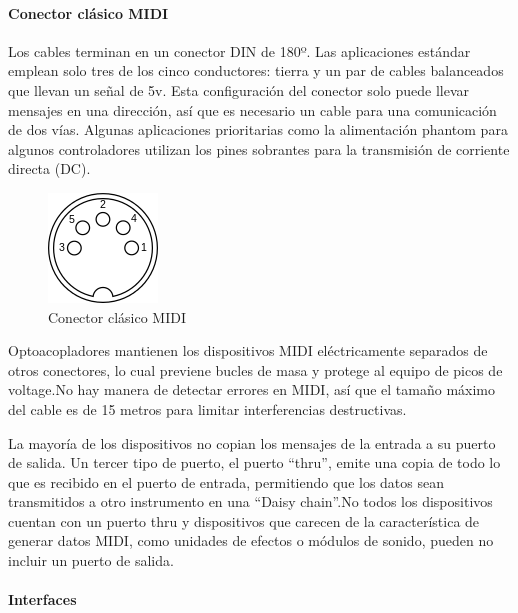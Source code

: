 \documentclass[a4paper,11pt,oneside]{book}
\begin{document}
\paragraph{Conector clásico MIDI}

Los cables terminan en un conector DIN de 180º. Las aplicaciones estándar emplean solo tres de los cinco conductores: tierra y un par de cables balanceados que llevan un señal de 5v. Esta configuración del conector solo puede llevar mensajes en una dirección, así que es necesario un cable para una comunicación de dos vías. Algunas aplicaciones prioritarias como la alimentación phantom para algunos controladores utilizan los pines sobrantes para la transmisión de corriente directa (DC).


\begin{figure}[H]
\begin{center}
\includegraphics[scale=0.2]{Imagenes/MIDI_connector2.png}
\caption{Conector clásico MIDI}
\label{Conector clásico MIDI}
\end{center}
\end{figure}

Optoacopladores mantienen los dispositivos MIDI eléctricamente separados de otros conectores, lo cual previene bucles de masa y protege al equipo de picos de voltage.No hay manera de detectar errores en MIDI, así que el tamaño máximo del cable es de 15 metros para limitar interferencias destructivas.

La mayoría de los dispositivos no copian los mensajes de la entrada a su puerto de salida. Un tercer tipo de puerto, el puerto ``thru'', emite una copia de todo lo que es recibido en el puerto de entrada, permitiendo que los datos sean transmitidos a otro instrumento en una ``Daisy chain''.No todos los dispositivos cuentan con un puerto thru y dispositivos que carecen de la característica de generar datos MIDI, como unidades de efectos o módulos de sonido, pueden no incluir un puerto de salida.


\paragraph{Interfaces}
\end{document}
